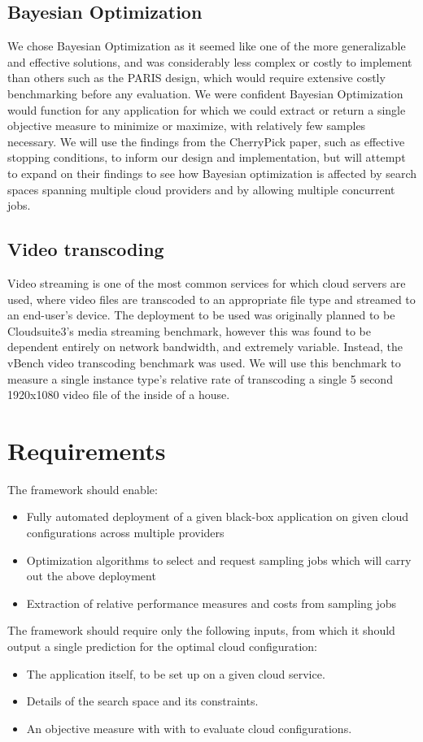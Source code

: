 \documentclass{report}
\begin{document}
\subsection{Bayesian Optimization}
We chose Bayesian Optimization as it seemed like one of the more generalizable and effective solutions\cite{Alipourfard2017}, and was considerably less complex or costly to implement than others such as the PARIS design, which would require extensive costly benchmarking before any evaluation\cite{Yadwadkar2017}. We were confident Bayesian Optimization would function for any application for which we could extract or return a single objective measure to minimize or maximize, with relatively few samples necessary. We will use the findings from the CherryPick paper, such as effective stopping conditions, to inform our design and implementation, but will attempt to expand on their findings to see how Bayesian optimization is affected by search spaces spanning multiple cloud providers and by allowing multiple concurrent jobs.
\subsection{Video transcoding}
Video streaming is one of the most common services for which cloud servers are used, where video files are transcoded to an appropriate file type and streamed to an end-user's device\cite{JunXin2005a, Lottarini2018}.
The deployment to be used was originally planned to be Cloudsuite3's media streaming benchmark\cite{Palit2016}, however this was found to be dependent entirely on network bandwidth, and extremely variable. Instead, the vBench video transcoding benchmark was used\cite{Lottarini2018}. We will use this benchmark to measure a single instance type's relative rate of transcoding a single 5 second 1920x1080 video file of the inside of a house.
\section{Requirements}
The framework should enable:
\begin{itemize}
\singlespacing
\item Fully automated deployment of a given black-box application on given cloud configurations across multiple providers
\item Optimization algorithms to select and request sampling jobs which will carry out the above deployment
\item Extraction of relative performance measures and costs from sampling jobs
\end{itemize}
The framework should require only the following inputs, from which it should output a single prediction for the optimal cloud configuration:
\begin{itemize}
\item The application itself, to be set up on a given cloud service.
\item Details of the search space and its constraints.
\item An objective measure with with to evaluate cloud configurations.
\end{itemize}
\end{document}
